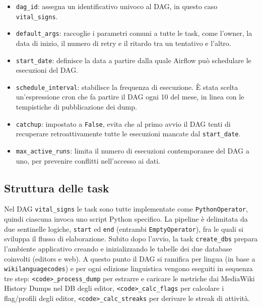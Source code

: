 \begin{itemize}
    \item \texttt{dag\_id}: assegna un identificativo univoco al DAG, in questo caso \texttt{vital\_signs}.
    \item \texttt{default\_args}: raccoglie i parametri comuni a tutte le task, come l'owner, la data di inizio, il numero di retry e il ritardo tra un tentativo e l'altro.
    \item \texttt{start\_date}: definisce la data a partire dalla quale Airflow può schedulare le esecuzioni del DAG.
    \item \texttt{schedule\_interval}: stabilisce la frequenza di esecuzione. È stata scelta un'espressione cron che fa partire il DAG ogni 10 del mese, in linea con le tempistiche di pubblicazione dei dump.
    \item \texttt{catchup}: impostato a \texttt{False}, evita che al primo avvio il DAG tenti di recuperare retroattivamente tutte le esecuzioni mancate dal \texttt{start\_date}.
    \item \texttt{max\_active\_runs}: limita il numero di esecuzioni contemporanee del DAG a uno, per prevenire conflitti nell'accesso ai dati.
\end{itemize}


\subsection{Struttura delle task}
\label{subsec:struttura_task}

Nel DAG \texttt{vital\_signs} le task sono tutte implementate come \texttt{PythonOperator},
quindi ciascuna invoca uno script Python specifico.
La pipeline è delimitata da due sentinelle logiche, \texttt{start} ed \texttt{end} (entrambi \texttt{EmptyOperator}), fra le quali si sviluppa il flusso di elaborazione.
Subito dopo l’avvio, la task \texttt{create\_dbs} prepara l’ambiente applicativo creando e inizializzando le tabelle dei due database coinvolti (editors e web).
A questo punto il DAG si ramifica per lingua (in base a \texttt{wikilanguagecodes}) e per ogni edizione linguistica vengono eseguiti in sequenza tre step:
\texttt{<code>\_process\_dump} per estrarre e caricare le metriche dai MediaWiki History Dumps nel DB degli editor,
\texttt{<code>\_calc\_flags} per calcolare i flag/profili degli editor,
\texttt{<code>\_calc\_streaks} per derivare le streak di attività.

